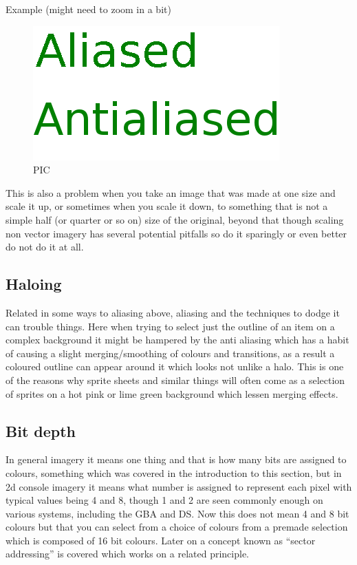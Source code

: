 \documentclass[
]{book}
\begin{document}
Example (might need to zoom in a bit)

\begin{figure}
\centering
\includegraphics{images/20_home_fast6191_romhackingguide_unrenamed_file___iginal_borders_romhackingguidebasicaliasing.png}
\caption{PIC}
\end{figure}

This is also a problem when you take an image that was made at one size and scale it up, or sometimes when you scale it down, to something that is not a simple half (or quarter or so on) size of the original, beyond that though scaling non vector imagery has several potential pitfalls so do it sparingly or even better do not do it at all.

\hypertarget{haloing}{%
\subsection{Haloing}\label{haloing}}

Related in some ways to aliasing above, aliasing and the techniques to dodge it can trouble things. Here when trying to select just the outline of an item on a complex background it might be hampered by the anti aliasing which has a habit of causing a slight merging/smoothing of colours and transitions, as a result a coloured outline can appear around it which looks not unlike a halo. This is one of the reasons why sprite sheets and similar things will often come as a selection of sprites on a hot pink or lime green background which lessen merging effects.

\hypertarget{bit-depth}{%
\subsection{Bit depth}\label{bit-depth}}

In general imagery it means one thing and that is how many bits are assigned to colours, something which was covered in the introduction to this section, but in 2d console imagery it means what number is assigned to represent each pixel with typical values being 4 and 8, though 1 and 2 are seen commonly enough on various systems, including the GBA and DS. Now this does not mean 4 and 8 bit colours but that you can select from a choice of colours from a premade selection which is composed of 16 bit colours. Later on a concept known as ``sector addressing'' is covered which works on a related principle.
\end{document}
